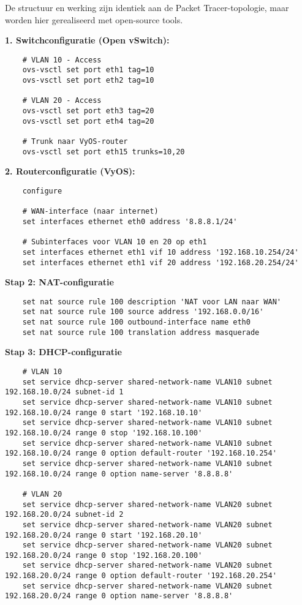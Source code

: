 De structuur en werking zijn identiek aan de Packet Tracer-topologie, maar worden hier gerealiseerd met open-source tools.


\textbf{1. Switchconfiguratie (Open vSwitch):}
\begin{verbatim}
    # VLAN 10 - Access
    ovs-vsctl set port eth1 tag=10
    ovs-vsctl set port eth2 tag=10
    
    # VLAN 20 - Access
    ovs-vsctl set port eth3 tag=20
    ovs-vsctl set port eth4 tag=20
    
    # Trunk naar VyOS-router
    ovs-vsctl set port eth15 trunks=10,20
\end{verbatim}

\textbf{2. Routerconfiguratie (VyOS):}
\begin{verbatim}
    configure
    
    # WAN-interface (naar internet)
    set interfaces ethernet eth0 address '8.8.8.1/24'
    
    # Subinterfaces voor VLAN 10 en 20 op eth1
    set interfaces ethernet eth1 vif 10 address '192.168.10.254/24'
    set interfaces ethernet eth1 vif 20 address '192.168.20.254/24'
\end{verbatim}

\textbf{Stap 2: NAT-configuratie}
\begin{verbatim}
    set nat source rule 100 description 'NAT voor LAN naar WAN'
    set nat source rule 100 source address '192.168.0.0/16'
    set nat source rule 100 outbound-interface name eth0
    set nat source rule 100 translation address masquerade
\end{verbatim}

\textbf{Stap 3: DHCP-configuratie}
\begin{verbatim}
    # VLAN 10
    set service dhcp-server shared-network-name VLAN10 subnet 192.168.10.0/24 subnet-id 1
    set service dhcp-server shared-network-name VLAN10 subnet 192.168.10.0/24 range 0 start '192.168.10.10'
    set service dhcp-server shared-network-name VLAN10 subnet 192.168.10.0/24 range 0 stop '192.168.10.100'
    set service dhcp-server shared-network-name VLAN10 subnet 192.168.10.0/24 range 0 option default-router '192.168.10.254'
    set service dhcp-server shared-network-name VLAN10 subnet 192.168.10.0/24 range 0 option name-server '8.8.8.8'
    
    # VLAN 20
    set service dhcp-server shared-network-name VLAN20 subnet 192.168.20.0/24 subnet-id 2
    set service dhcp-server shared-network-name VLAN20 subnet 192.168.20.0/24 range 0 start '192.168.20.10'
    set service dhcp-server shared-network-name VLAN20 subnet 192.168.20.0/24 range 0 stop '192.168.20.100'
    set service dhcp-server shared-network-name VLAN20 subnet 192.168.20.0/24 range 0 option default-router '192.168.20.254'
    set service dhcp-server shared-network-name VLAN20 subnet 192.168.20.0/24 range 0 option name-server '8.8.8.8'
\end{verbatim}


